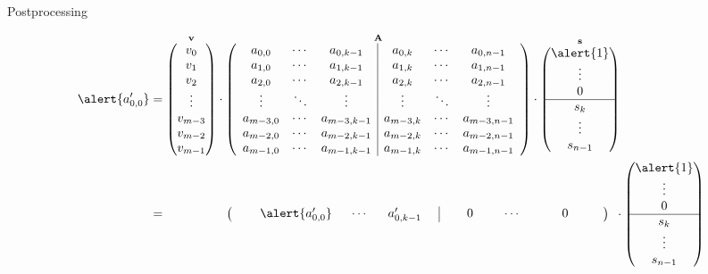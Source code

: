 \documentclass[presentation,smaller]{beamer}
\renewcommand{\vec}[1]{\ensuremath{\mathbf{#1}}\xspace}
\begin{document}
\begin{frame}[label={sec:orgheadline54}]{Postprocessing}
\begin{center}
\scriptsize
\begin{align*}
\alert{a'_{0,0}} &= \overset{\vec{v}}{\begin{pmatrix}
v_0\\
v_1\\
v_2\\
\vdots\\
v_{m-3}\\
v_{m-2}\\
v_{m-1}\\
\end{pmatrix}} \cdot 
\overset{\vec{A}}{
\left(\begin{array}{ccc|ccc} 
a_{0,0} & \cdots & a_{0,k-1} & a_{0,k} & \cdots & a_{0,n-1}\\
a_{1,0} & \cdots & a_{1,k-1} & a_{1,k} & \cdots & a_{1,n-1}\\
a_{2,0} & \cdots & a_{2,k-1} & a_{2,k} & \cdots & a_{2,n-1}\\
\vdots  & \ddots & \vdots & \vdots & \ddots & \vdots\\
a_{m-3,0} & \cdots & a_{m-3,k-1} & a_{m-3,k} & \cdots & a_{m-3,n-1}\\
a_{m-2,0} & \cdots & a_{m-2,k-1} & a_{m-2,k} & \cdots & a_{m-2,n-1}\\
a_{m-1,0} & \cdots & a_{m-1,k-1} & a_{m-1,k} & \cdots & a_{m-1,n-1}\\
\end{array}\right)} \cdot 
\overset{\vec{s}}{\begin{pmatrix}\alert{1}\\ \vdots\\ 0\\ \hline s_k\\ \vdots\\ s_{n-1}\\ \end{pmatrix}}\\
&= \phantom{\begin{pmatrix}v_m-3\end{pmatrix} \cdot\ } \left(\begin{array}{ccc|ccc} 
\phantom{xxx} \alert{a'_{0,0}} \phantom{x} & \cdots & \phantom{x} a'_{0,k-1} \phantom{xi} & \phantom{xxx} 0 \phantom{xxi} & \cdots & \phantom{xxxx} 0 \phantom{xxxx}\\
\end{array}\right) \phantom{i} \cdot {\begin{pmatrix}\alert{1}\\ \vdots\\ 0\\ \hline s_k\\ \vdots\\ s_{n-1}\\ \end{pmatrix}}\\
\end{align*}
\end{center}
\end{frame}
\end{document}

